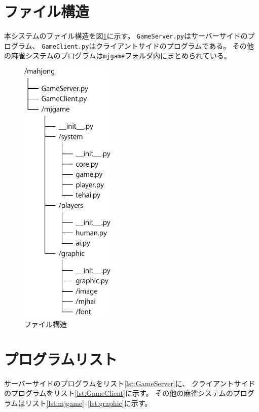 \documentclass[a4j,titlepage]{jsarticle}
\begin{document}
\section{ファイル構造}
本システムのファイル構造を図\ref{fig:file}に示す。
\texttt{GameServer.py}はサーバーサイドのプログラム、
\texttt{GameClient.py}はクライアントサイドのプログラムである。
その他の麻雀システムのプログラムは\texttt{mjgame}フォルダ内にまとめられている。

\begin{figure}[H]
  \centering
  \includegraphics[height=13cm]{images/file.pdf}
  \caption{ファイル構造}
  \label{fig:file}
\end{figure}

\newpage
\section{プログラムリスト}
サーバーサイドのプログラムをリスト\ref{lst:GameServer}に、
クライアントサイドのプログラムをリスト\ref{lst:GameClient}に示す。
その他の麻雀システムのプログラムはリスト\ref{lst:mjgame}--\ref{lst:graphic}に示す。




\end{document}
